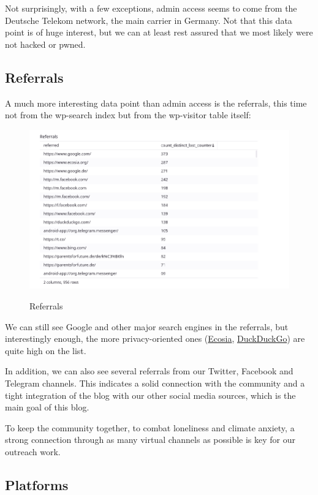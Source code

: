 Not surprisingly, with a few exceptions, admin access seems to come from the Deutsche Telekom network, the main carrier in Germany. Not that this data point is of huge interest, but we can at least rest assured that we most likely were not hacked or pwned.

\subsection{Referrals}

A much more interesting data point than admin access is the referrals, this time not from the wp-search index but from the wp-visitor table itself:

\begin{figure}[H]
\centering
\caption {Referrals}
\includegraphics[width=\linewidth]{images/figure07.png}
\label{fig:referrals}
\end{figure}

We can still see Google and other major search engines in the referrals, but interestingly enough, the more privacy-oriented ones (\href{https://www.ecosia.org/?c=en}{Ecosia}, \href{https://duckduckgo.com/}{DuckDuckGo}) are quite high on the list. 

In addition, we can also see several referrals from our Twitter, Facebook and Telegram channels. This indicates a solid connection with the community and a tight integration of the blog with our other social media sources, which is the main goal of this blog.

To keep the community together, to combat loneliness and climate anxiety, a strong connection through as many virtual channels as possible is key for our outreach work.

\subsection{Platforms}

